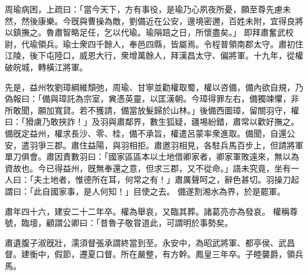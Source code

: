 \begin{pinyinscope}
 
周瑜病困，上疏曰：「當今天下，方有事役，是瑜乃心夙夜所憂，願至尊先慮未然，然後康樂。今旣與曹操為敵，劉備近在公安，邊境密邇，百姓未附，宜得良將以鎮撫之。魯肅智略足任，乞以代瑜。瑜隕踣之日，所懷盡矣。」
 即拜肅奮武校尉，代瑜領兵。瑜士衆四千餘人，奉邑四縣，皆屬焉。令程普領南郡太守。肅初住江陵，後下屯陸口，威恩大行，衆增萬餘人，拜漢昌太守、偏將軍。十九年，從權破皖城，轉橫江將軍。
 
 
先是，益州牧劉璋綱維頹弛，周瑜、甘寧並勸權取蜀，權以咨備，備內欲自規，乃偽報曰：「備與璋託為宗室，兾憑英靈，以匡漢朝。今璋得罪左右，備獨竦懼，非所敢聞，願加寬貸。若不獲請，備當放髮歸於山林。」後備西圖璋，留關羽守，權曰：「猾虜乃敢挾詐！」及羽與肅鄰界，數生狐疑，疆埸紛錯，肅常以歡好撫之。備旣定益州，權求長沙、零、桂，備不承旨，權遣呂蒙率衆進取。備聞，自還公安，遣羽爭三郡。肅住益陽，與羽相拒。肅邀羽相見，各駐兵馬百步上，但請將軍單刀俱會。肅因責數羽曰：「國家區區本以土地借卿家者，卿家軍敗遠來，無以為資故也。今已得益州，旣無奉還之意，但求三郡，又不從命。」語未究竟，坐有一人曰：「夫土地者，惟德所在耳，何常之有！」肅厲聲呵之，辭色甚切。羽操刀起謂曰：「此自國家事，是人何知！」目使之去。
 備遂割湘水為界，於是罷軍。
 
 
肅年四十六，建安二十二年卒。權為舉哀，又臨其葬。諸葛亮亦為發哀。
 權稱尊號，臨壇，顧謂公卿曰：「昔魯子敬甞道此，可謂明於事勢矣。
 
 
 
 
 肅遺腹子淑旣壯，濡須督張承謂終當到至。永安中，為昭武將軍、都亭侯、武昌督。建衡中，假節，遷夏口督。所在嚴整，有方幹。鳳皇三年卒。子睦襲爵，領兵馬。
 
 
\end{pinyinscope}